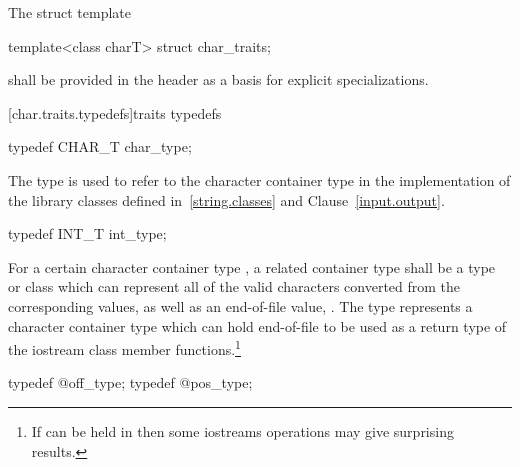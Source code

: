 \pnum
The struct template

%
\begin{codeblock}
template<class charT> struct char_traits;
\end{codeblock}

shall be provided in the header
as a basis for explicit specializations.

[char.traits.typedefs]{traits typedefs}

%
%
\begin{itemdecl}
typedef CHAR_T char_type;
\end{itemdecl}

\begin{itemdescr}
\pnum
The type
is used to refer to the character container type
in the implementation of the library classes defined in~\ref{string.classes} and Clause~\ref{input.output}.
\end{itemdescr}

%
%
\begin{itemdecl}
typedef INT_T int_type;
\end{itemdecl}

\begin{itemdescr}
\pnum
\requires
For a certain character container type
,
a related container type
shall be a type or class which can represent all of the
valid characters converted from the corresponding
values, as well as an end-of-file value,
.
The type
represents a character container type
which can hold end-of-file to be used as a return type
of the iostream class member functions.\footnote{If
can be held in
then some iostreams operations may give surprising results.}
\end{itemdescr}

%
%
%
%
\begin{itemdecl}
typedef @\impdef@ off_type;
typedef @\impdef@ pos_type;
\end{itemdecl}

